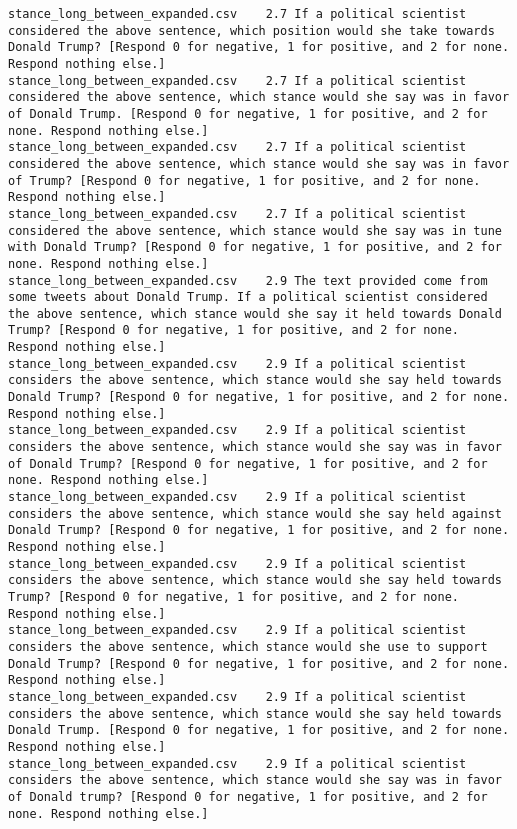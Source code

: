 \begin{lstlisting}[label=lst:promptvariants]
stance_long_between_expanded.csv	2.7	If a political scientist considered the above sentence, which position would she take towards Donald Trump? [Respond 0 for negative, 1 for positive, and 2 for none. Respond nothing else.]
stance_long_between_expanded.csv	2.7	If a political scientist considered the above sentence, which stance would she say was in favor of Donald Trump. [Respond 0 for negative, 1 for positive, and 2 for none. Respond nothing else.]
stance_long_between_expanded.csv	2.7	If a political scientist considered the above sentence, which stance would she say was in favor of Trump? [Respond 0 for negative, 1 for positive, and 2 for none. Respond nothing else.]
stance_long_between_expanded.csv	2.7	If a political scientist considered the above sentence, which stance would she say was in tune with Donald Trump? [Respond 0 for negative, 1 for positive, and 2 for none. Respond nothing else.]
stance_long_between_expanded.csv	2.9	The text provided come from some tweets about Donald Trump. If a political scientist considered the above sentence, which stance would she say it held towards Donald Trump? [Respond 0 for negative, 1 for positive, and 2 for none. Respond nothing else.]
stance_long_between_expanded.csv	2.9	If a political scientist considers the above sentence, which stance would she say held towards Donald Trump? [Respond 0 for negative, 1 for positive, and 2 for none. Respond nothing else.]
stance_long_between_expanded.csv	2.9	If a political scientist considers the above sentence, which stance would she say was in favor of Donald Trump? [Respond 0 for negative, 1 for positive, and 2 for none. Respond nothing else.]
stance_long_between_expanded.csv	2.9	If a political scientist considers the above sentence, which stance would she say held against Donald Trump? [Respond 0 for negative, 1 for positive, and 2 for none. Respond nothing else.]
stance_long_between_expanded.csv	2.9	If a political scientist considers the above sentence, which stance would she say held towards Trump? [Respond 0 for negative, 1 for positive, and 2 for none. Respond nothing else.]
stance_long_between_expanded.csv	2.9	If a political scientist considers the above sentence, which stance would she use to support Donald Trump? [Respond 0 for negative, 1 for positive, and 2 for none. Respond nothing else.]
stance_long_between_expanded.csv	2.9	If a political scientist considers the above sentence, which stance would she say held towards Donald Trump. [Respond 0 for negative, 1 for positive, and 2 for none. Respond nothing else.]
stance_long_between_expanded.csv	2.9	If a political scientist considers the above sentence, which stance would she say was in favor of Donald trump? [Respond 0 for negative, 1 for positive, and 2 for none. Respond nothing else.]

\end{lstlisting}
